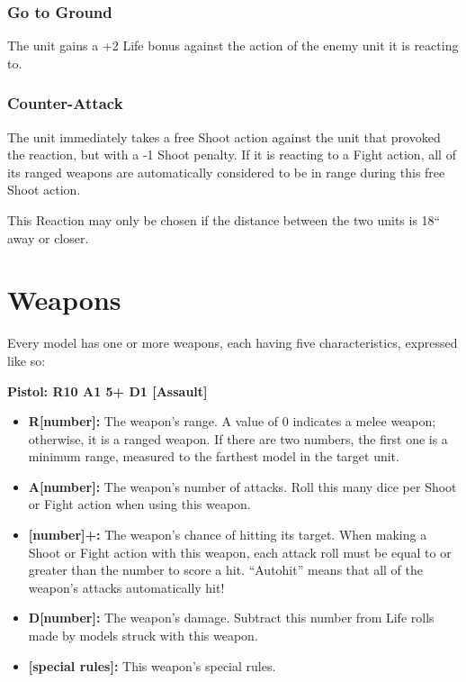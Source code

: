 \begin{multicols}{2}
\subsection*{Go to Ground}
The unit gains a +2 Life bonus against the action of the enemy unit it is reacting to.



\subsection*{Counter-Attack}
The unit immediately takes a free Shoot action against the unit that provoked the reaction, but with a -1 Shoot penalty. If it is reacting to a Fight action, all of its ranged weapons are automatically considered to be in range during this free Shoot action.

This Reaction may only be chosen if the distance between the two units is 18`` away or closer.




\chapter*{Weapons}

Every model has one or more weapons, each having five characteristics, expressed like so:

\textbf{Pistol: R10 A1 5+ D1 [Assault]}

\begin{itemize}
    \item \textbf{R[number]:} The weapon's range. A value of 0 indicates a melee weapon; otherwise, it is a ranged weapon. If there are two numbers, the first one is a minimum range, measured to the farthest model in the target unit.
    \item \textbf{A[number]:} The weapon's number of attacks. Roll this many dice per Shoot or Fight action when using this weapon.
    \item \textbf{[number]+:} The weapon's chance of hitting its target. When making a Shoot or Fight action with this weapon, each attack roll must be equal to or greater than the number to score a hit. ``Autohit'' means that all of the weapon's attacks automatically hit!
    \item \textbf{D[number]:} The weapon's damage. Subtract this number from Life rolls made by models struck with this weapon.
    \item \textbf{[special rules]:} This weapon's special rules.
\end{itemize}





\end{multicols}
